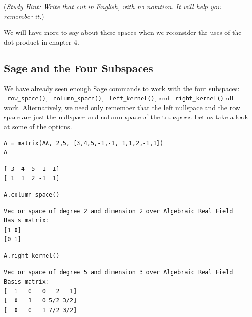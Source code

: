 \documentclass[10pt,]{book}
\theoremstyle{plain}
\theoremstyle{definition}
\numberwithin{equation}{section}
\begin{document}
      (\emph{Study Hint: Write that out in English, with no notation.
      It will help you remember it.})
\par

      We will have more to say about these spaces when we reconsider the uses
      of the dot product in chapter 4.
\typeout{************************************************}
\typeout{************************************************}
\subsection[Sage and the Four Subspaces]{Sage and the Four Subspaces}\label{subsection-88}

      We have already seen enough Sage commands to work with the four subspaces:
      \verb?.row_space()?, \verb?.column_space()?, \verb?.left_kernel()?, and
      \verb?.right_kernel()? all work.
      Alternatively, we need only remember that the left nullspace and the row
      space are just the nullspace and column space of the transpose. Let us
      take a look at some of the options.
\begin{lstlisting}[style=sageinput]
A = matrix(AA, 2,5, [3,4,5,-1,-1, 1,1,2,-1,1])
A
\end{lstlisting}
\begin{lstlisting}[style=sageoutput]
[ 3  4  5 -1 -1]
[ 1  1  2 -1  1]
\end{lstlisting}
\begin{lstlisting}[style=sageinput]
A.column_space()
\end{lstlisting}
\begin{lstlisting}[style=sageoutput]
Vector space of degree 2 and dimension 2 over Algebraic Real Field
Basis matrix:
[1 0]
[0 1]
\end{lstlisting}
\begin{lstlisting}[style=sageinput]
A.right_kernel()
\end{lstlisting}
\begin{lstlisting}[style=sageoutput]
Vector space of degree 5 and dimension 3 over Algebraic Real Field
Basis matrix:
[  1   0   0   2   1]
[  0   1   0 5/2 3/2]
[  0   0   1 7/2 3/2]
\end{lstlisting}
\par
\end{document}
